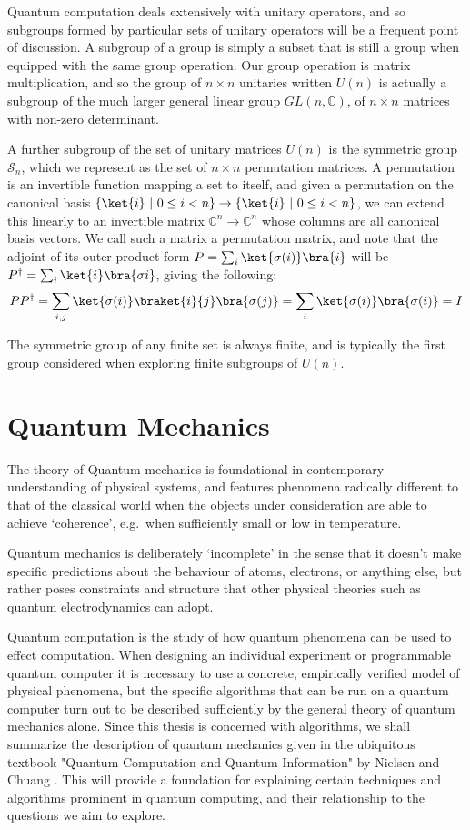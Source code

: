 Quantum computation deals extensively with unitary operators, and so subgroups formed by particular sets of unitary operators will be a frequent point of discussion. A subgroup of a group is simply a subset that is still a group when equipped with the same group operation. Our group operation is matrix multiplication, and so the group of $n \times n$ unitaries written $U(n)$ is actually a subgroup of the much larger general linear group $GL(n, \mathbb{C})$, of $n \times n$ matrices with non-zero determinant.

A further subgroup of the set of unitary matrices $U(n)$ is the symmetric group $\mathcal{S}_n$, which we represent as the set of $n \times n$ permutation matrices. A permutation is an invertible function mapping a set to itself, and given a permutation on the canonical basis $\{\ket{i}\ |\ 0 \leq i < n\} \to \{\ket{i}\ |\ 0 \leq i < n\}$, we can extend this linearly to an invertible matrix $\mathbb{C}^n \to \mathbb{C}^n$ whose columns are all canonical basis vectors. We call such a matrix a permutation matrix, and note that the adjoint of its outer product form $P = \sum_i \ket{\sigma(i)}\bra{i}$ will be $P^{\dagger} = \sum_i \ket{i}\bra{\sigma{i}}$, giving the following:
\begin{align*}
	PP^\dagger = \sum_{i,j} \ket{\sigma(i)}\braket{i}{j}\bra{\sigma(j)} = \sum_i \ket{\sigma(i)}\bra{\sigma(i)} = I
\end{align*}

The symmetric group of any finite set is always finite, and is typically the first group considered when exploring finite subgroups of $U(n)$.

\section{Quantum Mechanics}\label{qm}

The theory of Quantum mechanics is foundational in contemporary understanding of physical systems, and features phenomena radically different to that of the classical world when the objects under consideration are able to achieve `coherence', e.g.\ when sufficiently small or low in temperature.

Quantum mechanics is deliberately `incomplete' in the sense that it doesn't make specific predictions about the behaviour of atoms, electrons, or anything else, but rather poses constraints and structure that other physical theories such as quantum electrodynamics can adopt.

Quantum computation is the study of how quantum phenomena can be used to effect computation. When designing an individual experiment or programmable quantum computer it is necessary to use a concrete, empirically verified model of physical phenomena, but the specific algorithms that can be run on a quantum computer turn out to be described sufficiently by the general theory of quantum mechanics alone. Since this thesis is concerned with algorithms, we shall summarize the description of quantum mechanics given in the ubiquitous textbook "Quantum Computation and Quantum Information" by Nielsen and Chuang \cite{textbook}. This will provide a foundation for explaining certain techniques and algorithms prominent in quantum computing, and their relationship to the questions we aim to explore.
